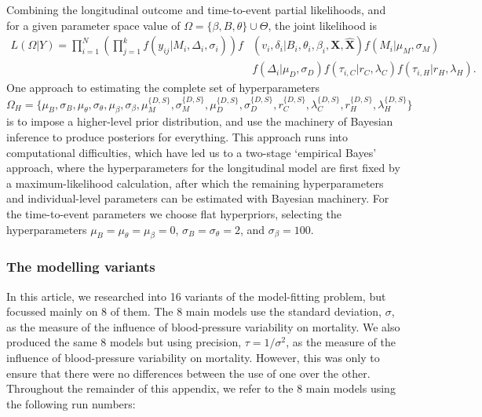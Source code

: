 \documentclass[
]{article}
\begin{document}
Combining the longitudinal outcome and time-to-event partial likelihoods, and for a given parameter space value of \(\Omega=\{\beta,B,\theta\}\cup \Theta\), the joint likelihood is
\begin{equation}
\begin{split}
  L(\Omega|Y)=\prod_{i=1}^N\left(\prod_{j=1}^{k}f(y_{ij}|M_i,\Delta_i,\sigma_i)\right)f&(v_i,\delta_i|B_i,\theta_i,\beta_i,\boldsymbol{X},\hat{\boldsymbol{X}})f(M_i|\mu_M,\sigma_M)\\
  &f(\Delta_i|\mu_D,\sigma_D)f(\tau_{i,C}|r_C,\lambda_C)f(\tau_{i,H}|r_H,\lambda_H).
  \end{split}
\end{equation}
One approach to estimating the complete set of hyperparameters
\begin{equation}
  \Omega_H=\{\mu_B,\sigma_B,\mu_\theta,\sigma_\theta,\mu_\beta,\sigma_\beta,\mu_M^{\{D,S\}},\sigma_M^{\{D,S\}},\mu_D^{\{D,S\}},\sigma_D^{\{D,S\}},r_C^{\{D,S\}},\lambda_C^{\{D,S\}},r_H^{\{D,S\}},\lambda_H^{\{D,S\}}\}
\end{equation}
is to impose a higher-level prior distribution, and use the machinery of Bayesian inference to produce posteriors for everything.
This approach runs into computational difficulties, which have led us to a two-stage `empirical Bayes' approach, where the hyperparameters for the longitudinal model are first fixed by a maximum-likelihood calculation, after which the remaining hyperparameters and individual-level parameters can be estimated with Bayesian machinery.
For the time-to-event parameters we choose flat hyperpriors, selecting the hyperparameters \(\mu_B=\mu_\theta=\mu_\beta=0\), \(\sigma_B=\sigma_\theta=2\), and \(\sigma_\beta=100\).

\subsubsection{The modelling variants}\label{the-modelling-variants}

In this article, we researched into 16 variants of the model-fitting problem, but focussed mainly on 8 of them.
The 8 main models use the standard deviation, \(\sigma\), as the measure of the influence of blood-pressure variability on mortality.
We also produced the same 8 models but using precision, \(\tau=1/\sigma^2\), as the measure of the influence of blood-pressure variability on mortality.
However, this was only to ensure that there were no differences between the use of one over the other.
Throughout the remainder of this appendix, we refer to the 8 main models using the following run numbers:
\end{document}
